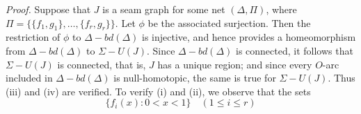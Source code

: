 \hspace*{12pt}

\textit{Proof.} Suppose that $J$ is a seam graph for some net $(\Delta, \Pi)$, where $\Pi = \{\{f_1, g_1\}, \dots, \{f_r, g_r\}\}$. Let $\phi$ be the associated surjection. Then the restriction of $\phi$ to $\Delta - bd(\Delta)$ is injective, and hence provides a homeomorphism from $\Delta - bd(\Delta)$ to $\Sigma - U(J)$. Since $\Delta - bd(\Delta)$ is connected, it follows that $\Sigma - U(J)$ is connected, that is, $J$ has a unique region; and since every $O$-arc included in $\Delta - bd(\Delta)$ is null-homotopic, the same is true for $\Sigma - U(J)$. Thus (iii) and (iv) are verified. To verify (i) and (ii), we observe that the sets
\begin{equation*}
\{f_i(x) \colon 0 < x < 1\} \quad (1 \le i \le r)
\end{equation*}
